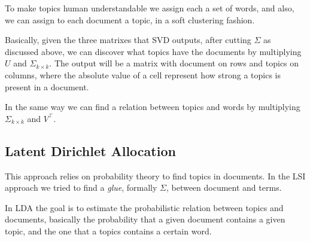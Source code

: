 To make topics human understandable 
we assign each a set of words, and also, we can assign to each 
document a topic, in a soft clustering fashion.

Basically, given the three matrixes that SVD outputs, after 
cutting $\Sigma$ as discussed above,   
we can discover what topics have the documents by multiplying 
$U$ and $\Sigma_{k \times k}$. The output will be a matrix with document 
on rows and topics on columns, where the absolute value of 
a cell represent how strong a topics is present in a document.

In the same way we can find a relation between topics and words 
by multiplying $\Sigma_{k \times k}$ and $V^\top$.

\subsection{Latent Dirichlet Allocation}
This approach relies on probability theory to find topics
in documents. 
In the LSI approach we tried to find a \emph{glue}, formally $\Sigma$,
between document and terms.

In LDA the goal is to estimate the probabilistic relation 
between topics and documents, basically the probability that 
a given document contains a given topic, and the one that 
a topics contains a certain word.